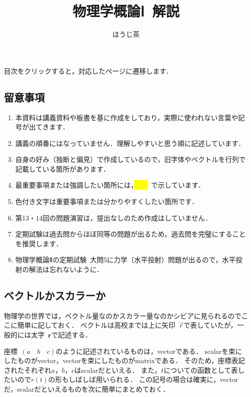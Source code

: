 \documentclass[a4paper,11pt]{ltjsarticle}
\title{物理学概論Ⅰ\ 解説}
\author{ほうじ茶}
\date{}
\begin{document}
\pagestyle{fancy}
\rhead{}
\cfoot{\thepage}

\maketitle
\tableofcontents


\begin{center}
  目次をクリックすると，対応したページに遷移します．
\end{center}

\subsection*{留意事項}

\begin{enumerate}
  \item 本資料は講義資料や板書を基に作成をしており，実際に使われない言葉や記号が出てきます．
  \item 講義の順番にはなっていません．理解しやすいと思う順に記述しています．
  \item 自身の好み（独断と偏見）で作成しているので，旧字体やベクトルを行列で記載している箇所があります．
  \item 最重要事項または強調したい箇所には，\colorbox{yellow}{　　}\ で示しています．
  \item 色付き文字は重要事項または分かりやすくしたい箇所です．
  \item 第13・14回の問題演習は，提出なしのため作成はしていません．
  \item 定期試験は過去問からほぼ同等の問題が出るため，過去問を完璧にすることを推奨します．
  \item 物理学概論Ⅱの定期試験\ 大問5に力学（水平投射）問題が出るので，水平投射の解法は忘れないように．
\end{enumerate}

\subsection*{ベクトルかスカラーか}

物理学の世界では，ベクトル量なのかスカラー量なのかシビアに見られるのでここに簡単に記しておく．
ベクトルは高校までは上に矢印\ $\vec{r}$で表していたが，一般的には太字\ $\bm{r}$で記述する．

座標\ $(a \quad b \quad c)$のように記述されているものは，vectorである．
scalarを束にしたものがvector，vectorを束にしたものがmatrixである．
そのため，座標表記されたそれぞれ$a$，$b$，$c$はscalarだといえる．
また，$t$についての函数として表したいので$r(t)$の形もしばしば用いられる．
この記号の場合は確実に，vectorだ，scalarだといえるものを次に簡単にまとめておく．
\end{document}
